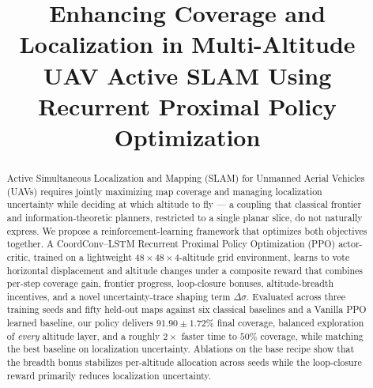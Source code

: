 \documentclass[conference]{IEEEtran}
\begin{document}
\title{\huge Enhancing Coverage and Localization in Multi-Altitude UAV Active SLAM Using Recurrent Proximal Policy Optimization}

\author{
\and
{}
}

\maketitle

\begin{abstract}
Active Simultaneous Localization and Mapping (SLAM) for Unmanned Aerial Vehicles (UAVs) requires jointly maximizing map coverage and managing localization uncertainty while deciding at which altitude to fly --- a coupling that classical frontier and information-theoretic planners, restricted to a single planar slice, do not naturally express. We propose a reinforcement-learning framework that optimizes both objectives together. A CoordConv--LSTM Recurrent Proximal Policy Optimization (PPO) actor-critic, trained on a lightweight $48{\times}48{\times}4$-altitude grid environment, learns to vote horizontal displacement and altitude changes under a composite reward that combines per-step coverage gain, frontier progress, loop-closure bonuses, altitude-breadth incentives, and a novel uncertainty-trace shaping term $\Delta\sigma$. Evaluated across three training seeds and fifty held-out maps against six classical baselines and a Vanilla PPO learned baseline, our policy delivers $\mathbf{91.90 \pm 1.72\%}$ final coverage, balanced exploration of \emph{every} altitude layer, and a roughly $2{\times}$ faster time to $50\%$ coverage, while matching the best baseline on localization uncertainty. Ablations on the base recipe show that the breadth bonus stabilizes per-altitude allocation across seeds while the loop-closure reward primarily reduces localization uncertainty.
\end{abstract}
\end{document}
